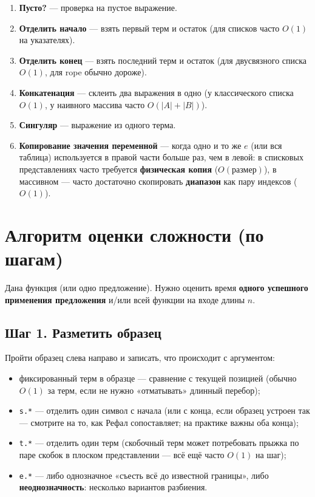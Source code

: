 \documentclass[12pt,a4paper]{article}
\begin{document}
\begin{enumerate}
  \item \textbf{Пусто?} --- проверка на пустое выражение.
  \item \textbf{Отделить начало} --- взять первый терм и остаток (для списков часто \(O(1)\) на указателях).
  \item \textbf{Отделить конец} --- взять последний терм и остаток (для двусвязного списка \(O(1)\), для rope обычно дороже).
  \item \textbf{Конкатенация} --- склеить два выражения в одно (у классического списка \(O(1)\), у наивного массива часто \(O(|A|+|B|)\)).
  \item \textbf{Сингуляр} --- выражение из одного терма.
  \item \textbf{Копирование значения переменной} --- когда одно и то же \(e\) (или вся таблица) используется в правой части больше раз, чем в левой: в списковых представлениях часто требуется \textbf{физическая копия} (\(O(\text{размер})\)), в массивном --- часто достаточно скопировать \textbf{диапазон} как пару индексов (\(O(1)\)).
\end{enumerate}

\section{Алгоритм оценки сложности (по шагам)}

Дана функция (или одно предложение). Нужно оценить время \textbf{одного успешного применения предложения} и/или всей функции на входе длины \(n\).

\subsection{Шаг 1. Разметить образец}

Пройти образец слева направо и записать, что происходит с аргументом:
\begin{itemize}
  \item фиксированный терм в образце --- сравнение с текущей позицией (обычно \(O(1)\) за терм, если не нужно «отматывать» длинный перебор);
  \item \texttt{s.*} --- отделить один символ с начала (или с конца, если образец устроен так --- смотрите на то, как Рефал сопоставляет; на практике важны оба конца);
  \item \texttt{t.*} --- отделить один терм (скобочный терм может потребовать прыжка по паре скобок в плоском представлении --- всё ещё часто \(O(1)\) на шаг);
  \item \texttt{e.*} --- либо однозначное «съесть всё до известной границы», либо \textbf{неоднозначность}: несколько вариантов разбиения.
\end{itemize}
\end{document}
